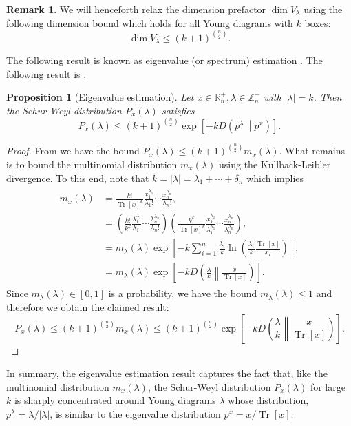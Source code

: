 \documentclass[pdflatex, sn-mathphys-num]{sn-jnl} %
\theoremstyle{plain}
\newtheorem{prop}[thm]{Proposition}
\theoremstyle{definition}
\newtheorem{rem}[thm]{Remark}%
\let\cref\crtcref
\DeclareMathOperator{\Tr}{Tr}
\newcommand{\polyk}[1]{(k\!+\!1)^{#1}}
\newcommand{\kl}[2]{D\!\left(#1\middle\|#2\right)} %
\newcommand{\SW}[1]{P_{#1}}
\newcommand{\undomweightsp}[1]{\mathbb Z^{+}_{#1}}
\newcommand{\eigsp}[1]{\mathbb R^{+}_{#1}}
\newcommand{\ex}{x}
\newcommand{\tex}{\Tr[\ex]}
\newcommand{\yd}{\delta}
\newcommand{\yx}{\lambda}
\newcommand{\syx}{|\yx|}
\begin{document}
\begin{rem}
    We will henceforth relax the dimension prefactor $\dim V_{\yx}$ using the following dimension bound which holds for all Young diagrams with $k$ boxes:
    \begin{equation}
        \label{eq:unitary_irrep_dim_bound}
        \dim V_{\yx} \leq \polyk{\binom{n}{2}}.
    \end{equation}
\end{rem}
The following result is known as eigenvalue (or spectrum) estimation \cite{alicki1988symmetry,keyl2001estimating,hayashi2002quantum,odonnell2016efficient}.
The following result is \cite[Theorem 1]{christandl2006spectra}.
\begin{prop}[Eigenvalue estimation]
    \label{prop:eig_est}
    Let $x \in \eigsp{n}, \yx \in \undomweightsp{n}$ with $\syx = k$.
    Then the Schur-Weyl distribution $\SW{\ex}(\yx)$ satisfies
    \begin{equation}
        \SW{\ex}(\yx) \leq \polyk{\binom{n}{2}} \exp\left[-k \kl{p^{\yx}}{p^\ex}\right].
    \end{equation}
\end{prop}
\begin{proof}
    From \cref{prop:multinomial_bound} we have the bound $\SW{\ex}(\yx) \leq \polyk{\binom{n}{2}} m_{\ex}(\yx)$.
    What remains is to bound the multinomial distribution $m_{\ex}(\yx)$ using the Kullback-Leibler divergence.
    To this end, note that $k = \syx = \yx_1 + \cdots + \yd_n$ which implies
    \begin{align}
        \begin{split}
            m_{\ex}(\yx)
            &= \frac{k!}{\tex^{k}}\frac{\ex_1^{\yx_1}}{\yx_1!}\cdots \frac{\ex_n^{\yx_n}}{\yx_n!}, \\
            &= \left(\frac{k!}{k^{k}} \frac{\yx_1^{\yx_1}}{\yx_1!} \cdots \frac{\yx_n^{\yx_n}}{\yx_n!}\right)
            \left(\frac{k^{k}}{\tex^{k}}\frac{\ex_1^{\yx_1}}{\yx_1^{\yx_1}}\cdots \frac{\ex_n^{\yx_n}}{\yx_n^{\yx_n}}\right), \\
            &= m_{\yx}(\yx)
            \exp\left[ - k \sum_{i=1}^{n} \frac{\yx_i}{k} \ln \left(\frac{\yx_i}{k} \frac{\tex}{\ex_i}\right)  \right], \\
            &= m_{\yx}(\yx)
            \exp\left[ - k \kl{\frac{\yx}{k}}{\frac{\ex}{\tex}} \right].
        \end{split}
    \end{align}
    Since $m_{\yx}(\yx) \in [0,1]$ is a probability, we have the bound $m_{\yx}(\yx) \leq 1$ and therefore we obtain the claimed result:
    \begin{equation}
        \SW{\ex}(\yx) \leq \polyk{\binom{n}{2}} m_{\ex}(\yx) \leq \polyk{\binom{n}{2}}\exp\left[ - k \kl{\frac{\yx}{k}}{\frac{\ex}{\tex}} \right].
    \end{equation}
\end{proof}
In summary, the eigenvalue estimation result captures the fact that, like the multinomial distribution $m_x(\yx)$, the Schur-Weyl distribution $\SW{\ex}(\yx)$ for large $k$ is sharply concentrated around Young diagrams $\yx$ whose distribution, $p^{\yx} = \yx/\syx$, is similar to the eigenvalue distribution $p^{\ex} = \ex/\tex$.
\end{document}
